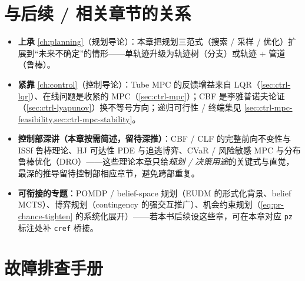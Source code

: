 \section*{与后续 / 相关章节的关系}

\begin{itemize}
  \item \textbf{上承} \cref{ch:planning}（规划导论）：本章把规划三范式（搜索 / 采样 / 优化）扩展到“未来不确定”的情形——单轨迹升级为轨迹树（分支）或轨迹 + 管道（鲁棒）。
  \item \textbf{紧靠} \cref{ch:control}（控制导论）：Tube MPC 的反馈增益来自 LQR（\cref{sec:ctrl-lqr}）、在线问题是收紧的 MPC（\cref{sec:ctrl-mpc}）；CBF 是李雅普诺夫论证（\cref{sec:ctrl-lyapunov}）换不等号方向；递归可行性 / 终端集见 \cref{sec:ctrl-mpc-feasibility,sec:ctrl-mpc-stability}。
  \item \textbf{控制部深讲（本章按需简述，留待深推）}：CBF / CLF 的完整前向不变性与 ISSf 鲁棒理论、HJ 可达性 PDE 与追逃博弈、CVaR / 风险敏感 MPC 与分布鲁棒优化（DRO）——这些理论本章只给\emph{规划 / 决策用途}的关键式与直觉，最深的推导留待控制部相应章节，避免跨部重复。
  \item \textbf{可衔接的专题}：POMDP / belief-space 规划（EUDM 的形式化背景、belief MCTS）、博弈规划（contingency 的强交互推广）、机会约束规划（\cref{eq:pr-chance-tighten} 的系统化展开）——若本书后续设这些章，可在本章对应 \texttt{pz} 标注处补 \texttt{cref} 桥接。
\end{itemize}

\section*{故障排查手册}

